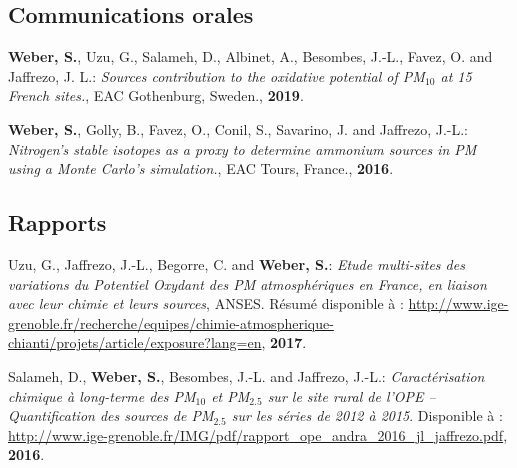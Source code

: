 \subsection{Communications orales}

\begin{etaremune}
    \item \textbf{Weber, S.}, Uzu, G., Salameh, D., Albinet, A., Besombes, J.-L., Favez,
        O. and Jaffrezo, J. L.:
        \textit{Sources contribution to the oxidative potential of PM$_{10}$ at
        15 French sites.}, EAC Gothenburg, Sweden., \textbf{2019}.
    \item \textbf{Weber, S.}, Golly, B., Favez, O., Conil, S., Savarino, J. and Jaffrezo,
        J.-L.:
        \textit{Nitrogen’s stable isotopes as a proxy to determine ammonium sources in PM
        using a Monte Carlo’s simulation.}, EAC Tours, France., \textbf{2016}.
\end{etaremune}

\subsection{Rapports}
\begin{etaremune}
    \item Uzu, G., Jaffrezo, J.-L., Begorre, C. and \textbf{Weber, S.}: 
        \textit{Etude multi-sites des variations du Potentiel Oxydant des PM
        atmosphériques en France, en liaison avec leur chimie et leurs sources},
        ANSES. Résumé disponible à :
        \url{http://www.ige-grenoble.fr/recherche/equipes/chimie-atmospherique-chianti/projets/article/exposure?lang=en},
        \textbf{2017}.
    \item Salameh, D., \textbf{Weber, S.}, Besombes, J.-L. and Jaffrezo, J.-L.:
        \textit{Caractérisation chimique à long-terme des PM$_{10}$ et PM$_{2.5}$ sur le
            site rural de l’OPE – Quantification des sources de PM$_{2.5}$ sur les séries de
        2012 à 2015}. 
        Disponible à :
        \url{http://www.ige-grenoble.fr/IMG/pdf/rapport_ope_andra_2016_jl_jaffrezo.pdf},
        \textbf{2016}.
\end{etaremune}

